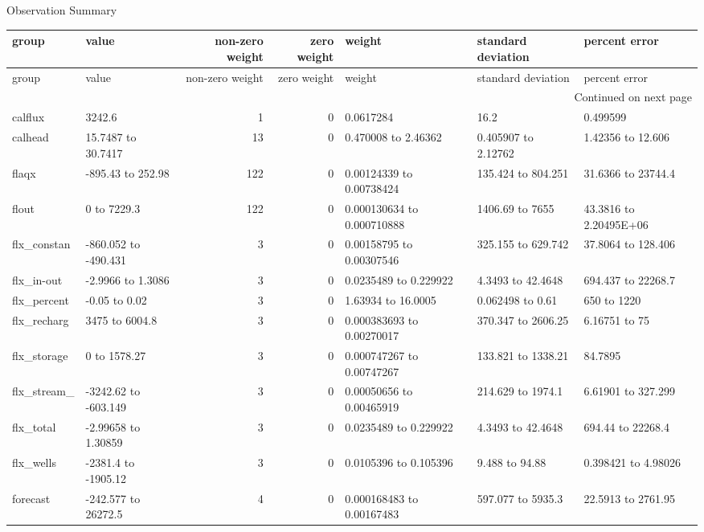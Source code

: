 \documentclass{article}
\begin{document}
\begin{center}
Observation Summary
\end{center}
\begin{center}
\begin{landscape}
\setlength{\LTleft}{-4.0cm}
\begin{longtable}{llrrlll}
group & value & non-zero weight & zero weight & weight & standard deviation & percent error \\
\endfirsthead
group & value & non-zero weight & zero weight & weight & standard deviation & percent error \\
\endhead
\multicolumn{7}{r}{Continued on next page} \\
\endfoot
\endlastfoot
calflux & 3242.6 & 1 & 0 & 0.0617284 &  16.2 & 0.499599 \\
calhead & 15.7487 to 30.7417 & 13 & 0 & 0.470008 to 2.46362 & 0.405907 to 2.12762 & 1.42356 to 12.606 \\
flaqx & -895.43 to 252.98 & 122 & 0 & 0.00124339 to 0.00738424 & 135.424 to 804.251 & 31.6366 to 23744.4 \\
flout &     0 to 7229.3 & 122 & 0 & 0.000130634 to 0.000710888 & 1406.69 to  7655 & 43.3816 to 2.20495E+06 \\
flx_constan & -860.052 to -490.431 & 3 & 0 & 0.00158795 to 0.00307546 & 325.155 to 629.742 & 37.8064 to 128.406 \\
flx_in-out & -2.9966 to 1.3086 & 3 & 0 & 0.0235489 to 0.229922 & 4.3493 to 42.4648 & 694.437 to 22268.7 \\
flx_percent & -0.05 to  0.02 & 3 & 0 & 1.63934 to 16.0005 & 0.062498 to  0.61 &   650 to  1220 \\
flx_recharg &  3475 to 6004.8 & 3 & 0 & 0.000383693 to 0.00270017 & 370.347 to 2606.25 & 6.16751 to    75 \\
flx_storage &     0 to 1578.27 & 3 & 0 & 0.000747267 to 0.00747267 & 133.821 to 1338.21 & 84.7895 \\
flx_stream_ & -3242.62 to -603.149 & 3 & 0 & 0.00050656 to 0.00465919 & 214.629 to 1974.1 & 6.61901 to 327.299 \\
flx_total & -2.99658 to 1.30859 & 3 & 0 & 0.0235489 to 0.229922 & 4.3493 to 42.4648 & 694.44 to 22268.4 \\
flx_wells & -2381.4 to -1905.12 & 3 & 0 & 0.0105396 to 0.105396 & 9.488 to 94.88 & 0.398421 to 4.98026 \\
forecast & -242.577 to 26272.5 & 4 & 0 & 0.000168483 to 0.00167483 & 597.077 to 5935.3 & 22.5913 to 2761.95 \\

\end{longtable}
\end{landscape}
\end{center}
\end{document}
